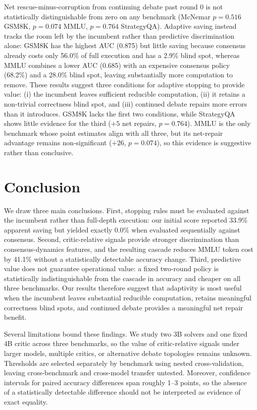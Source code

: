 \documentclass{llncs}
\begin{document}
Net rescue-minus-corruption from continuing debate past round 0 is not statistically distinguishable from zero on any benchmark (McNemar $p=0.516$ GSM8K, $p=0.074$ MMLU, $p=0.764$ StrategyQA). Adaptive saving instead tracks the room left by the incumbent rather than predictive discrimination alone: GSM8K has the highest AUC (0.875) but little saving because consensus already costs only 56.0\% of full execution and has a 2.9\% blind spot, whereas MMLU combines a lower AUC (0.685) with an expensive consensus policy (68.2\%) and a 28.0\% blind spot, leaving substantially more computation to remove. These results suggest three conditions for adaptive stopping to provide value: (i) the incumbent leaves sufficient reducible computation, (ii) it retains a non-trivial correctness blind spot, and (iii) continued debate repairs more errors than it introduces. GSM8K lacks the first two conditions, while StrategyQA shows little evidence for the third ($+5$ net repairs, $p=0.764$). MMLU is the only benchmark whose point estimates align with all three, but its net-repair advantage remains non-significant ($+26$, $p=0.074$), so this evidence is suggestive rather than conclusive.

\section{Conclusion}
We draw three main conclusions. First, stopping rules must be evaluated against the incumbent rather than full-depth execution: our initial score reported 33.9\% apparent saving but yielded exactly 0.0\% when evaluated sequentially against consensus. Second, critic-relative signals provide stronger discrimination than consensus-dynamics features, and the resulting cascade reduces MMLU token cost by 41.1\% without a statistically detectable accuracy change. Third, predictive value does not guarantee operational value: a fixed two-round policy is statistically indistinguishable from the cascade in accuracy and cheaper on all three benchmarks. Our results therefore suggest that adaptivity is most useful when the incumbent leaves substantial reducible computation, retains meaningful correctness blind spots, and continued debate provides a meaningful net repair benefit.

Several limitations bound these findings. We study two 3B solvers and one fixed 4B critic across three benchmarks, so the value of critic-relative signals under larger models, multiple critics, or alternative debate topologies remains unknown. Thresholds are selected separately by benchmark using nested cross-validation, leaving cross-benchmark and cross-model transfer untested. Moreover, confidence intervals for paired accuracy differences span roughly 1--3 points, so the absence of a statistically detectable difference should not be interpreted as evidence of exact equality.
\end{document}
